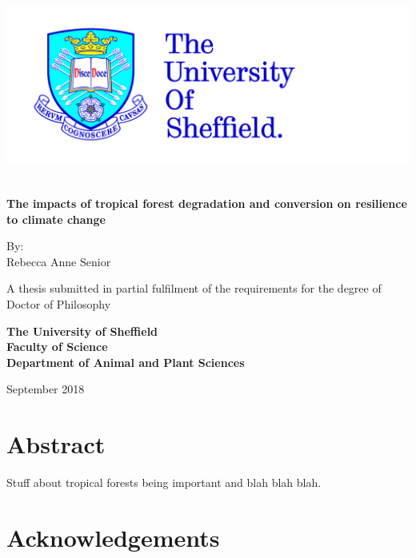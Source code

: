 \documentclass[12pt,a4paper,]{report}
\title{}
\author{}
\date{}
\theoremstyle{definition}
\theoremstyle{definition}
\theoremstyle{definition}
\theoremstyle{remark}
\begin{document}
\thispagestyle{empty}
\begin{center}
\includegraphics{logos/tuoslogo_cmyk_hi.jpg}
\vspace{1.5cm}
 {\Huge\bfseries \\The impacts of tropical forest degradation and conversion on resilience to climate change\par}
 \vspace{1.5cm}
 {\Large By:\\ Rebecca Anne Senior\par}
 \vspace{1.5cm}
 {A thesis submitted in partial fulfilment of the requirements for the degree of\\ Doctor of Philosophy\par}
 \vspace{2cm}\bfseries
 The University of Sheffield\\
 Faculty of Science\\
 Department of Animal and Plant Sciences\par
 \vfill
 {\large {\normalfont September 2018\par}}
\end{center}

\setlength{\abovedisplayskip}{-5pt}
\setlength{\abovedisplayshortskip}{-5pt}

{
\setcounter{tocdepth}{1}
\tableofcontents
}
\listoftables
\listoffigures
\chapter*{Abstract}\label{abstract}

Stuff about tropical forests being important and blah blah blah.

\pagebreak

\chapter*{Acknowledgements}\label{acknowledgements}
\end{document}
